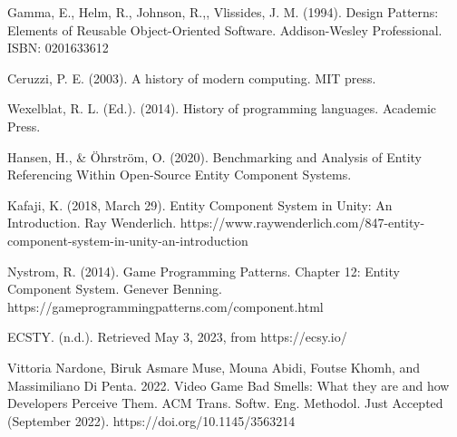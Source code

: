 \documentclass{IEEEcsmag}
\begin{document}
\def\refname{REFERENCES}

\begin{thebibliography}{1}

Gamma, E., Helm, R., Johnson, R.,, Vlissides, J. M. (1994). Design Patterns: Elements of Reusable Object-Oriented Software. Addison-Wesley Professional. ISBN: 0201633612

Ceruzzi, P. E. (2003). A history of modern computing. MIT press.

Wexelblat, R. L. (Ed.). (2014). History of programming languages. Academic Press.

Hansen, H., \& Öhrström, O. (2020). Benchmarking and Analysis of Entity Referencing Within Open-Source Entity Component Systems.

Kafaji, K. (2018, March 29). Entity Component System in Unity: An Introduction. Ray Wenderlich. https://www.raywenderlich.com/847-entity-component-system-in-unity-an-introduction

Nystrom, R. (2014). Game Programming Patterns. Chapter 12: Entity Component System. Genever Benning. https://gameprogrammingpatterns.com/component.html

ECSTY. (n.d.). Retrieved May 3, 2023, from https://ecsy.io/

Vittoria Nardone, Biruk Asmare Muse, Mouna Abidi, Foutse Khomh, and Massimiliano Di Penta. 2022. Video Game Bad Smells: What they are and how Developers Perceive Them. ACM Trans. Softw. Eng. Methodol. Just Accepted (September 2022). https://doi.org/10.1145/3563214

\end{thebibliography}
\end{document}
